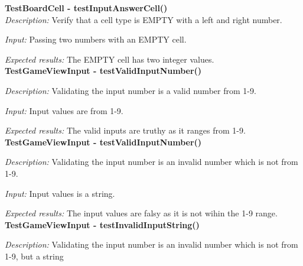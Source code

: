 \documentclass[12pt]{article}
\begin{document}
\textbf{TestBoardCell - testInputAnswerCell()} \\

\textit{Description:} \newline
Verify that a cell type is EMPTY with a left and right number. \newline

\textit{Input:} \newline
Passing two numbers with an EMPTY cell. \newline 

\textit{Expected results:} \newline
The EMPTY cell has two integer values. \newline
\\

\textbf{TestGameViewInput - testValidInputNumber()} 
    
\textit{Description:} \newline
Validating the input number is a valid number from 1-9.  \newline

\textit{Input:} \newline
Input values are from 1-9. \newline 

\textit{Expected results:} \newline
The valid inputs are truthy as it ranges from 1-9. \newline
\\

\textbf{TestGameViewInput - testValidInputNumber()} 
    
\textit{Description:} \newline
Validating the input number is an invalid number which is not from 1-9.  \newline

\textit{Input:} \newline
Input values is a string. \newline 

\textit{Expected results:} \newline
The input values are falsy as it is not wihin the 1-9 range. \newline
\\

\textbf{TestGameViewInput - testInvalidInputString()} 
    
\textit{Description:} \newline
Validating the input number is an invalid number which is not from 1-9, but a string  \newline
\end{document}
